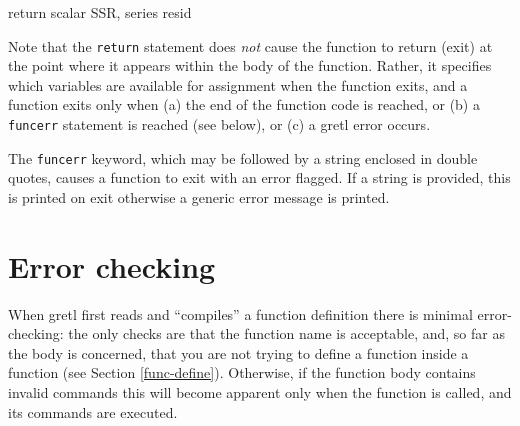 \begin{code}
      return scalar SSR, series resid
\end{code}

Note that the \verb+return+ statement does \emph{not} cause the
function to return (exit) at the point where it appears within the
body of the function. Rather, it specifies which variables are
available for assignment when the function exits, and a function exits
only when (a) the end of the function code is reached, or (b) a
\verb+funcerr+ statement is reached (see below), or (c) a gretl error
occurs.
    
The \verb+funcerr+ keyword, which may be followed by a string enclosed
in double quotes, causes a function to exit with an error flagged.  If
a string is provided, this is printed on exit otherwise a generic
error message is printed.
    

\section{Error checking}
\label{func-errors}

When gretl first reads and ``compiles'' a function definition there is
minimal error-checking: the only checks are that the function name is
acceptable, and, so far as the body is concerned, that you are not
trying to define a function inside a function (see Section
\ref{func-define}). Otherwise, if the function body contains invalid
commands this will become apparent only when the function is called,
and its commands are executed.
    

